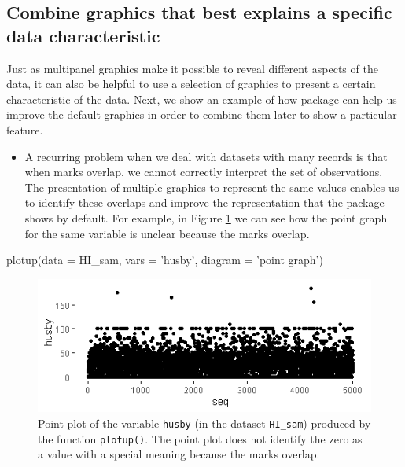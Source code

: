 \hypertarget{combine-graphics-that-best-explains-a-specific-data-characteristic}{%
	\subsection{Combine graphics that best explains a specific data
characteristic}\label{combine-graphics-that-best-explains-a-specific-data-characteristic}}

Just as multipanel graphics make it possible to reveal different aspects
of the data, it can also be helpful to use a selection of graphics to
present a certain characteristic of the data. Next, we show an example
of how  package can help us improve the default graphics in
order to combine them later to show a particular feature.

\begin{itemize}
	\tightlist
	\item
	A recurring problem when we deal with datasets with many records is
	that when marks overlap, we cannot correctly interpret the set of
	observations. The presentation of multiple graphics to represent the
	same values enables us to identify these overlaps and improve the
	representation that the package shows by default. For example, in
	Figure \ref{fig:HI_3} we can see how the point graph for the same
	variable  is unclear because the marks overlap.
\end{itemize}

\begin{example}
  plotup(data = HI_sam, vars = 'husby', diagram = 'point graph')
\end{example}

\begin{Schunk}
	\begin{figure}[H]
\includegraphics[width=0.6\linewidth]{figures/HI_3-1} \caption[To be honest, a very improvable point graph]{Point plot of the variable \texttt{husby} (in the dataset \texttt{HI\_sam}) produced by the function \texttt{plotup()}. The point plot does not identify the zero as a value with a special meaning because the marks overlap.}\label{fig:HI_3}
	\end{figure}
\end{Schunk}

